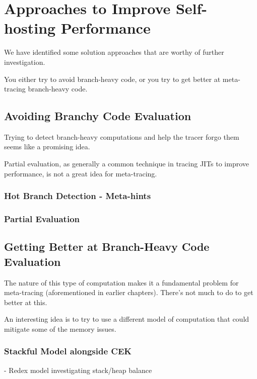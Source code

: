 \chapter{Approaches to Improve Self-hosting Performance}
	\begin{chapterpoint}
		We have identified some solution approaches that are worthy of further investigation.

		You either try to avoid branch-heavy code, or you try to get better at meta-tracing branch-heavy code.
	\end{chapterpoint}

	\section{Avoiding Branchy Code Evaluation}
		\begin{mainpoint}
			Trying to detect branch-heavy computations and help the tracer forgo them seems like a promising idea.

			Partial evaluation, as generally a common technique in tracing JITs to improve performance, is not a great idea for meta-tracing.
		\end{mainpoint}
		\subsection{Hot Branch Detection - Meta-hints}
		\subsection{Partial Evaluation}

	\section{Getting Better at Branch-Heavy Code Evaluation}
		\begin{mainpoint}
			The nature of this type of computation makes it a fundamental problem for meta-tracing (aforementioned in earlier chapters). There's not much to do to get better at this.

			An interesting idea is to try to use a different model of computation that could mitigate some of the memory issues.
		\end{mainpoint}

		\subsection{Stackful Model alongside CEK}
		- Redex model investigating stack/heap balance
